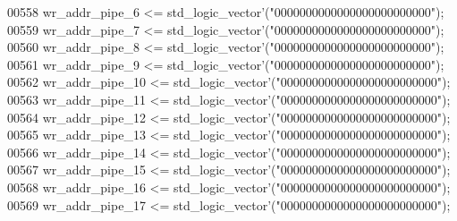 \begin{DoxyCode}
00558       \textcolor{vhdlchar}{wr_addr_pipe_6} \textcolor{vhdlchar}{<=} \textcolor{comment}{std\_logic\_vector}\textcolor{vhdlchar}{'}\textcolor{vhdlchar}{(}\textcolor{vhdllogic}{"0000000000000000000000000"}\textcolor{vhdlchar}{)};
00559       \textcolor{vhdlchar}{wr_addr_pipe_7} \textcolor{vhdlchar}{<=} \textcolor{comment}{std\_logic\_vector}\textcolor{vhdlchar}{'}\textcolor{vhdlchar}{(}\textcolor{vhdllogic}{"0000000000000000000000000"}\textcolor{vhdlchar}{)};
00560       \textcolor{vhdlchar}{wr_addr_pipe_8} \textcolor{vhdlchar}{<=} \textcolor{comment}{std\_logic\_vector}\textcolor{vhdlchar}{'}\textcolor{vhdlchar}{(}\textcolor{vhdllogic}{"0000000000000000000000000"}\textcolor{vhdlchar}{)};
00561       \textcolor{vhdlchar}{wr_addr_pipe_9} \textcolor{vhdlchar}{<=} \textcolor{comment}{std\_logic\_vector}\textcolor{vhdlchar}{'}\textcolor{vhdlchar}{(}\textcolor{vhdllogic}{"0000000000000000000000000"}\textcolor{vhdlchar}{)};
00562       \textcolor{vhdlchar}{wr_addr_pipe_10} \textcolor{vhdlchar}{<=} \textcolor{comment}{std\_logic\_vector}\textcolor{vhdlchar}{'}\textcolor{vhdlchar}{(}\textcolor{vhdllogic}{"0000000000000000000000000"}\textcolor{vhdlchar}{)};
00563       \textcolor{vhdlchar}{wr_addr_pipe_11} \textcolor{vhdlchar}{<=} \textcolor{comment}{std\_logic\_vector}\textcolor{vhdlchar}{'}\textcolor{vhdlchar}{(}\textcolor{vhdllogic}{"0000000000000000000000000"}\textcolor{vhdlchar}{)};
00564       \textcolor{vhdlchar}{wr_addr_pipe_12} \textcolor{vhdlchar}{<=} \textcolor{comment}{std\_logic\_vector}\textcolor{vhdlchar}{'}\textcolor{vhdlchar}{(}\textcolor{vhdllogic}{"0000000000000000000000000"}\textcolor{vhdlchar}{)};
00565       \textcolor{vhdlchar}{wr_addr_pipe_13} \textcolor{vhdlchar}{<=} \textcolor{comment}{std\_logic\_vector}\textcolor{vhdlchar}{'}\textcolor{vhdlchar}{(}\textcolor{vhdllogic}{"0000000000000000000000000"}\textcolor{vhdlchar}{)};
00566       \textcolor{vhdlchar}{wr_addr_pipe_14} \textcolor{vhdlchar}{<=} \textcolor{comment}{std\_logic\_vector}\textcolor{vhdlchar}{'}\textcolor{vhdlchar}{(}\textcolor{vhdllogic}{"0000000000000000000000000"}\textcolor{vhdlchar}{)};
00567       \textcolor{vhdlchar}{wr_addr_pipe_15} \textcolor{vhdlchar}{<=} \textcolor{comment}{std\_logic\_vector}\textcolor{vhdlchar}{'}\textcolor{vhdlchar}{(}\textcolor{vhdllogic}{"0000000000000000000000000"}\textcolor{vhdlchar}{)};
00568       \textcolor{vhdlchar}{wr_addr_pipe_16} \textcolor{vhdlchar}{<=} \textcolor{comment}{std\_logic\_vector}\textcolor{vhdlchar}{'}\textcolor{vhdlchar}{(}\textcolor{vhdllogic}{"0000000000000000000000000"}\textcolor{vhdlchar}{)};
00569       \textcolor{vhdlchar}{wr_addr_pipe_17} \textcolor{vhdlchar}{<=} \textcolor{comment}{std\_logic\_vector}\textcolor{vhdlchar}{'}\textcolor{vhdlchar}{(}\textcolor{vhdllogic}{"0000000000000000000000000"}\textcolor{vhdlchar}{)};

\end{DoxyCode}
